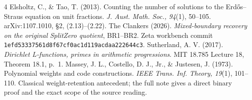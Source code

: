 \documentclass[10pt,a4paper]{article}
\begin{document}
\begingroup\footnotesize
\begin{thebibliography}{4}
 Elsholtz, C., \& Tao, T. (2013). Counting the number of solutions
to the Erd\H{o}s--Straus equation on unit fractions.
\emph{J. Aust. Math. Soc., 94}(1), 50--105. arXiv:1107.1010, \S2, (2.13)--(2.22).
 The Clankers (2026). \emph{Mixed-boundary recovery on the original
SplitZero quotient}, BR1--BR2. Zeta workbench commit
\texttt{1efd53337561d8f67cf0ac1d119acdaa222644c3}.
 Sutherland, A. V. (2017). \emph{Dirichlet L-functions,
primes in arithmetic progressions}. MIT 18.785 Lecture 18, Theorem 18.1, p.~1.
 Massey, J. L., Costello, D. J., Jr., \& Justesen, J. (1973).
Polynomial weights and code constructions. \emph{IEEE Trans. Inf. Theory, 19}(1),
101--110. Classical weight-retention antecedent; the full note gives a direct
binary proof and the exact scope of the source reading.
\end{thebibliography}\endgroup
\end{document}
